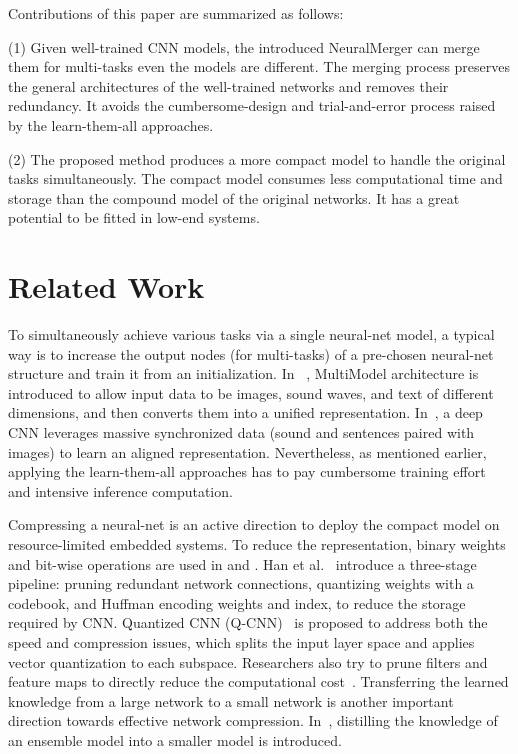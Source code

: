 \documentclass{article}
\begin{document}
	Contributions of this paper are summarized as follows:
	
	\noindent (1) Given well-trained CNN models, the introduced NeuralMerger can merge them for multi-tasks even the models are different. The merging process preserves the general architectures of the well-trained networks and removes their redundancy. It avoids the cumbersome-design and trial-and-error process raised by the learn-them-all approaches.
	
	\noindent (2) The proposed method produces a more compact model to handle the original tasks simultaneously. The compact model consumes less computational time and storage than the compound model of the original networks. It has a great potential to be fitted in low-end systems.
	
	
	
	\section{Related Work}
	To simultaneously achieve various tasks via a single neural-net model, a typical way is to increase the output nodes (for multi-tasks) of a pre-chosen neural-net structure and train it from an initialization.
	In ~\cite{DBLP:journals/corr/KaiserGSVPJU17}, MultiModel architecture is introduced to allow input data to be images, sound waves, and text of different dimensions, and then converts them into a unified representation.
	In~\cite{DBLP:journals/corr/AytarVT17}, a deep CNN leverages massive synchronized data (sound and sentences paired with images) to learn an aligned representation.
	Nevertheless, as mentioned earlier, applying the learn-them-all approaches has to pay cumbersome training effort and intensive inference computation.
	
	Compressing a neural-net is an active direction to deploy the compact model on resource-limited embedded systems.
	To reduce the representation, binary weights and bit-wise operations are used in %
	\cite{hubara2016binarized} and %
	\cite{rastegari2016xnor}.
	Han et al.~\cite{Han16} introduce a three-stage pipeline: pruning redundant network connections, quantizing weights with a codebook, and Huffman encoding weights and index, to reduce the storage required by CNN. %
	Quantized CNN (Q-CNN)~\cite{Wu16} is proposed to address both the speed and compression issues, which splits the input layer space and applies vector quantization to each subspace.
	Researchers also try to prune filters and feature maps to directly reduce the computational cost~\cite{molchanov2016pruning}\cite{li2016pruning}\cite{he2017channel}.
	Transferring the learned knowledge from a large network to a small network is another important direction towards effective network compression.
	In~\cite{HintonDistilling14}, distilling the knowledge of an ensemble model into a smaller model is introduced. %
	
\end{document}
